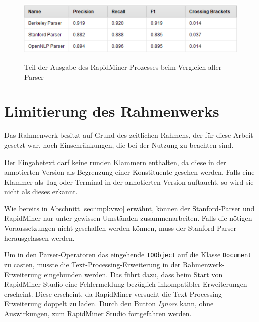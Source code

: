 \begin{figure}
\includegraphics[width=\textwidth]{gfx/shortresults.png} 
\label{fig:results}	
\caption{Teil der Ausgabe des RapidMiner-Prozesses beim Vergleich aller Parser}	
\end{figure}

\section{Limitierung des Rahmenwerks}

Das Rahmenwerk besitzt auf Grund des zeitlichen Rahmens, der für diese Arbeit gesetzt war, noch Einschränkungen, die bei der Nutzung zu beachten sind. 

Der Eingabetext darf keine runden Klammern enthalten, da diese in der annotierten Version als Begrenzung einer Konstituente gesehen werden. Falls eine Klammer als Tag oder Terminal in der annotierten Version auftaucht, so wird sie nicht als dieses erkannt. 

Wie bereits in Abschnitt \ref{sec:impl:vwo} erwähnt, können der Stanford-Parser und RapidMiner nur unter gewissen Umständen zusammenarbeiten. Falls die nötigen Voraussetzungen nicht geschaffen werden können, muss der Stanford-Parser herausgelassen werden.

Um in den Parser-Operatoren das eingehende \texttt{IOObject} auf die Klasse \texttt{Document} zu casten, musste die Text-Processing-Erweiterung in der Rahmenwerk-Erweiterung eingebunden werden. Das führt dazu, dass beim Start von RapidMiner Studio eine Fehlermeldung bezüglich inkompatibler Erweiterungen erscheint. Diese erscheint, da RapidMiner versucht die Text-Processing-Erweiterung doppelt zu laden. Durch den Button \textit{Ignore} kann, ohne Auswirkungen, zum RapidMiner Studio fortgefahren werden.
 